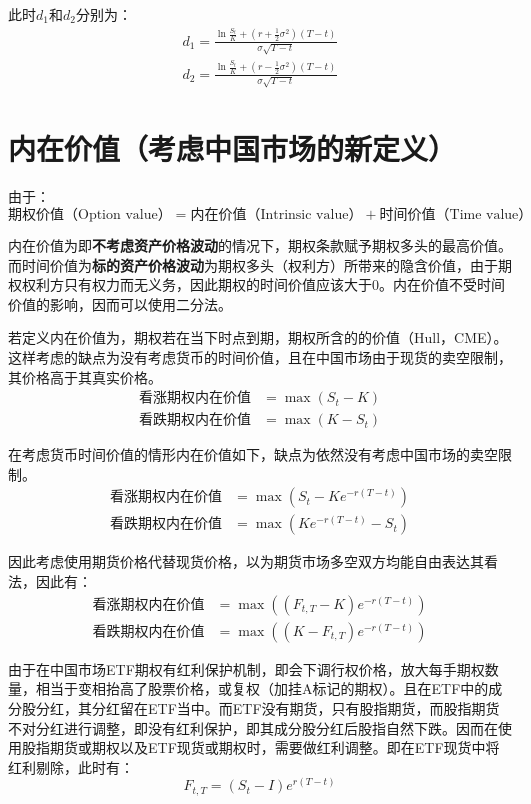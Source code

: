 \documentclass[11pt]{article}
\begin{document}
此时$d_1$和$d_2$分别为：
\begin{align*}
    d_1 = \frac{\ln \frac{S_t}{K} + (r+\frac{1}{2}\sigma^2)(T-t)}{\sigma\sqrt{T-t}} \\
    d_2 = \frac{\ln \frac{S_t}{K} + (r-\frac{1}{2}\sigma^2)(T-t)}{\sigma\sqrt{T-t}}
\end{align*}

\section{内在价值（考虑中国市场的新定义）}

由于：
\begin{equation*}
    \text{期权价值（Option value）} = \text{内在价值（Intrinsic value）} + \text{时间价值（Time value）}
\end{equation*}

内在价值为即\textbf{不考虑资产价格波动}的情况下，期权条款赋予期权多头的最高价值。而时间价值为\textbf{标的资产价格波动}为期权多头（权利方）所带来的隐含价值，由于期权权利方只有权力而无义务，因此期权的时间价值应该大于0。内在价值不受时间价值的影响，因而可以使用二分法。


若定义内在价值为，期权若在当下时点到期，期权所含的的价值（Hull，CME）。这样考虑的缺点为没有考虑货币的时间价值，且在中国市场由于现货的卖空限制，其价格高于其真实价格。
\begin{align*}
    \text{看涨期权内在价值} & = \max(S_t-K) \\
    \text{看跌期权内在价值} & = \max(K-S_t)
\end{align*}

在考虑货币时间价值的情形内在价值如下，缺点为依然没有考虑中国市场的卖空限制。
\begin{align*}
    \text{看涨期权内在价值} & = \max(S_t-Ke^{-r(T-t)}) \\
    \text{看跌期权内在价值} & = \max(Ke^{-r(T-t)}-S_t)
\end{align*}

因此考虑使用期货价格代替现货价格，以为期货市场多空双方均能自由表达其看法，因此有：
\begin{align*}
    \text{看涨期权内在价值} & = \max((F_{t,T}-K)e^{-r(T-t)}) \\
    \text{看跌期权内在价值} & = \max((K-F_{t,T})e^{-r(T-t)})
\end{align*}

由于在中国市场ETF期权有红利保护机制，即会下调行权价格，放大每手期权数量，相当于变相抬高了股票价格，或复权（加挂A标记的期权）。且在ETF中的成分股分红，其分红留在ETF当中。而ETF没有期货，只有股指期货，而股指期货不对分红进行调整，即没有红利保护，即其成分股分红后股指自然下跌。因而在使用股指期货或期权以及ETF现货或期权时，需要做红利调整。即在ETF现货中将红利剔除，此时有：
\begin{equation*}
    F_{t,T} = (S_t-I)e^{r(T-t)}
\end{equation*}
\end{document}
